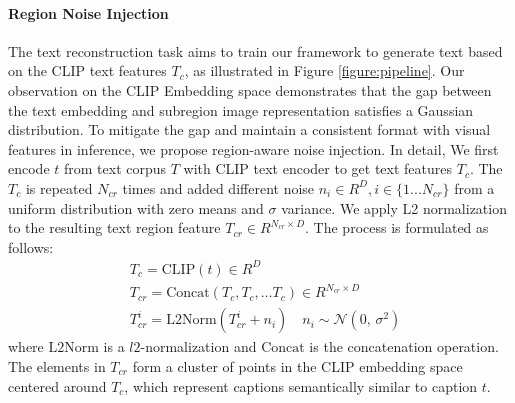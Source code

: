 \paragraph{\textbf{Region Noise Injection}} The text reconstruction task aims to train our framework to generate text based on the CLIP text features $T_c$, as illustrated in Figure \ref{figure:pipeline}. Our observation on the CLIP Embedding space demonstrates that the gap between the text embedding and subregion image representation satisfies a Gaussian distribution. To mitigate the gap and maintain a consistent format with visual features in inference, we propose region-aware noise injection.
In detail, We first encode $t$ from text corpus $T$ with CLIP text encoder to get text features $T_c$. The $T_c$ is repeated $N_{cr}$ times and added different noise $n_i \in R^{D}, i\in\{1... N_{cr}\}$ from a uniform distribution with zero means and $\sigma$ variance. We apply L2 normalization to the resulting text region feature $T_{cr} \in R^{N_{cr} \times D}$. The process is formulated as follows: 
\begin{align}
    &T_c = \mathrm{CLIP}(t) \in R^{D} \\
    &T_{cr} = \mathrm{Concat}(T_c, T_c, \dots T_c) \in R^{N_{cr} \times D} \\
    &T_{cr}^{i} = \mathrm{L2Norm}(T_{cr}^{i} + n_i) \quad n_i \sim \mathcal{N}(0,\,\sigma^{2})
\end{align}
where $\mathrm{L2Norm}$ is a $l2$-normalization and $\mathrm{Concat}$ is the concatenation operation. The elements in $T_{cr}$ form a cluster of points in the CLIP embedding space centered around $T_c$, which represent captions semantically similar to caption $t$. 

